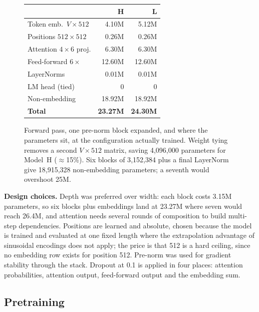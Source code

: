 \documentclass[10pt]{article}
\begin{document}
\begin{figure}[!htb]
\begin{minipage}[c]{0.30\textwidth}
\begin{tabular}{lrr}
\toprule
& \textbf{H} & \textbf{L} \\
\midrule
Token emb.\ $V{\times}512$ & 4.10M & 5.12M \\
Positions $512{\times}512$ & 0.26M & 0.26M \\
Attention $4{\times}6$ proj. & 6.30M & 6.30M \\
Feed-forward $6{\times}$ & 12.60M & 12.60M \\
LayerNorms & 0.01M & 0.01M \\
LM head (tied) & 0 & 0 \\
\midrule
Non-embedding & 18.92M & 18.92M \\
\textbf{Total} & \textbf{23.27M} & \textbf{24.30M} \\
\bottomrule
\end{tabular}
\end{minipage}
\caption{Forward pass, one pre-norm block expanded, and where the parameters sit, at
the configuration actually trained. Weight tying removes a second $V\!\times\!512$
matrix, saving 4{,}096{,}000 parameters for Model~H ($\approx$15\%). Six blocks of
3{,}152{,}384 plus a final LayerNorm give 18{,}915{,}328 non-embedding parameters; a
seventh would overshoot 25M.}
\label{fig:arch}
\end{figure}

\textbf{Design choices.} Depth was preferred over width: each block costs
3.15M parameters, so six blocks plus embeddings land at 23.27M where seven would
reach 26.4M, and attention needs several rounds of composition to build multi-step
dependencies. Positions are learned and absolute, chosen because the model is trained
and evaluated at one fixed length where the extrapolation advantage of sinusoidal
encodings does not apply; the price is that 512 is a hard ceiling, since no embedding
row exists for position 512. Pre-norm was used for gradient stability through the
stack. Dropout at 0.1 is applied in four places: attention probabilities, attention
output, feed-forward output and the embedding sum.

\subsection{Pretraining}
\end{document}
